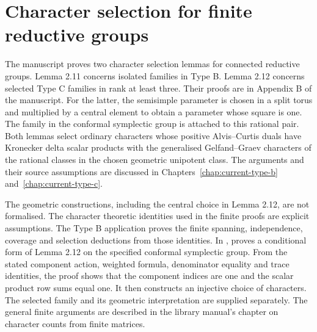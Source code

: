 \section{Character selection for finite reductive groups}

The manuscript proves two character selection lemmas for connected
reductive groups. Lemma 2.11 concerns isolated families in Type B.
Lemma 2.12 concerns selected Type C families in rank at least three.
Their proofs are in Appendix B of the manuscript.
For the latter, the semisimple parameter is chosen in a split torus
and multiplied by a central element to obtain a parameter whose square is one.
The family in the conformal symplectic group is attached to this
rational pair. Both lemmas select ordinary characters whose positive
Alvis--Curtis duals have Kronecker delta scalar products with the
generalised Gelfand--Graev characters of the rational classes in the
chosen geometric unipotent class. The arguments and their source
assumptions are discussed in Chapters~\ref{chap:current-type-b}
and~\ref{chap:current-type-c}.

\enlargethispage{2\baselineskip}
\begin{implementation}
The geometric constructions, including the central choice in Lemma 2.12,
are not formalised. The character theoretic identities used in the finite
proofs are explicit assumptions. The Type B application proves the finite spanning,
independence, coverage and selection deductions from those identities.
In ,
 proves a conditional form of Lemma 2.12 on the
specified conformal symplectic group. From the stated component action,
weighted formula, denominator equality and trace identities, the proof
shows that the component indices are one and the scalar product row sums
equal one. It then constructs an injective choice of characters. The
selected family and its geometric interpretation are supplied separately.
The general finite arguments are described in the library manual's
chapter on character counts from finite matrices.
\end{implementation}
